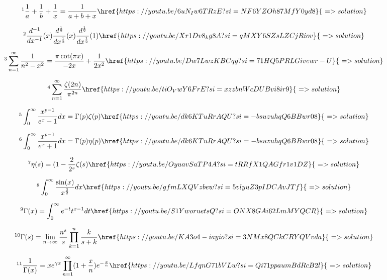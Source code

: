 \documentclass[12pt]{article}
\begin{document}
\[ \footnote{ Unseemingly hard Quadratic equation} \frac{1}{a}+\frac{1}{b}+\frac{1}{x}=\frac{1}{a+b+x}  \href{https://youtu.be/6uN_Iw6TRzE?si=NF6YZOh87MfY0yd8}{\,\,=>solution}   \]

\[ \footnote{ WTF are these things?)} \frac{d^{-1}}{dx^{-1}}(x)   \frac{d^{\frac{1}{2}}}{dx^{\frac{1}{2}}}(x)    \frac{d^{\frac{1}{2}}}{dx^{\frac{1}{2}}}(1) \href{https://youtu.be/Xr1Dv8_kg8A?si=qMXY6SZsLZCjRiov}{\,\,=>solution}   \] 

\[ \footnote{ How come we have cot here?} \sum_{n=1}^{\infty} \frac{1}{n^2-x^2} = \frac{\pi \cot(\pi x)}{-2x}+\frac{1}{2x^2}  \href{https://youtu.be/Dw7LwzKBCqg?si=71HQ5PRLGivewr-U}{\,\,=>solution}   \]

\[ \footnote{ Stanford Mathematics Tournament} \sum_{n=1}^{\infty} \frac{\zeta(2n)}{\pi^{2n}} \href{https://youtu.be/tiO_VwY6FrE?si=xzzbnWcDUBvi8ir9}{\,\,=>solution}   \]

\[ \footnote{ $x^{p-1}/e^x-1$ // Product of Eulers Gamma and Reimann zeta function interms of Bose integral} \int_0^{\infty} \frac{x^{p-1}}{e^x-1} dx = \Gamma(p) \zeta(p) \href{https://youtu.be/dk6KTuRrAQU?si=-bsuzuhqQ6BBwr08}{\,\,=>solution}   \]

\[ \footnote{ $x^{p-1}/e^x+1$ // Product of Eulers Gamma and Dirichlet eta function} \int_0^{\infty} \frac{x^{p-1}}{e^x+1} dx = \Gamma(p) \eta(p)  \href{https://youtu.be/dk6KTuRrAQU?si=-bsuzuhqQ6BBwr08}{\,\,=>solution}   \]

\[ \footnote{ Relation between Dirichlet Eta and Reimann Zeta Function} \eta(s)= (1-\frac{2}{2^s}\zeta(s)  \href{https://youtu.be/OyuavSaTP4A?si=tRRfX1QAGfr1v1DZ}{\,\,=>solution}   \]

\[ \footnote{MIT Integration Bee: This is the best application of MAZ Identity} \int_0^{\infty} \frac{\sin(x)}{x^{\frac{3}{2}}} dx  \href{https://youtu.be/gfmLXQVzbew?si=5vlyuZ3pIDCAvJTf}{\,\,=>solution}   \]

\[ \footnote{ Euler Representation of Gamma Function} \Gamma(x) = \int_0^{\infty} e^{-t} t^{x-1} dt   \href{https://youtu.be/S1YworuetsQ?si=ONX8GAi62LmMYQCR}{\,\,=>solution}   \]

\[ \footnote{ Gauss Representation of Gamma Function} \Gamma(s) = \lim_{n\to\infty} \frac{n^s}{s} \prod_{k=1}^{n} \frac{k}{s+k} \href{https://youtu.be/KA3o4-iayio?si=3NMx8QCkCRYQVvda}{\,\,=>solution}   \]

\[ \footnote{ Weierstrass Representation of Gamma Function} \frac{1}{\Gamma(x)}= x e^{\gamma x} \prod_{n=1}^{\infty} (1+\frac{x}{n}) e^{-\frac{x}{n}} \href{https://youtu.be/LfqnG71bVLw?si=Qi71ppaumBdRcB2l}{\,\,=>solution}   \]
\end{document}
